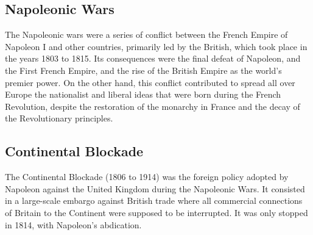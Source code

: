 \documentclass[12pt,a4paper,notitlepage,english]{article}
\begin{document}
\subsection{Napoleonic Wars}
The Napoleonic wars were a series of conflict between the French Empire of Napoleon I and  other countries, primarily led by the British, which took place in the years 1803 to 1815. Its consequences were the final defeat of Napoleon, and the First French Empire, and the rise of the British Empire as the world's premier power. On the other hand, this conflict contributed to spread all over Europe the nationalist and liberal ideas that were born during the French Revolution, despite the restoration of the monarchy in France and the decay of the Revolutionary principles. 

\subsection{Continental Blockade}
The Continental Blockade (1806 to 1914) was the foreign policy adopted by Napoleon against the United Kingdom during the Napoleonic Wars. It consisted in a large-scale embargo against British trade where all commercial connections of Britain to the Continent were supposed to be interrupted. It was only stopped in 1814, with Napoleon's abdication. 
\end{document}
